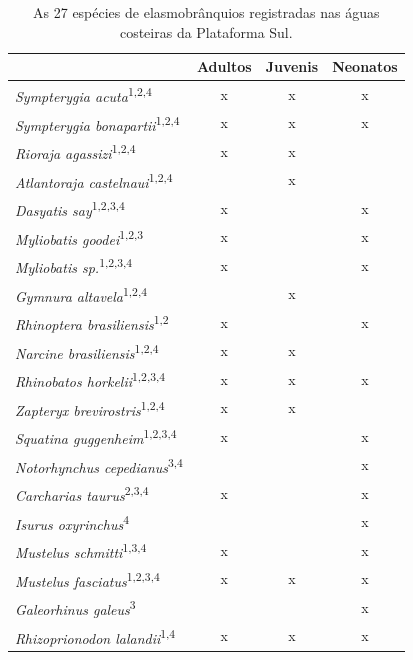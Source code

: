 \documentclass[a4paper,11pt,twoside,showtrims,onecolumn,openright,final]{memoir}
\begin{document}
\begin{table}
\caption[As 27 espécies de elasmobrânquios registradas nas águas costeiras da Plataforma Sul]
	{As 27 espécies de elasmobrânquios registradas nas águas costeiras da Plataforma Sul.}
\label{tab:elasmos-tab2}
\begin{tabular*}{\textwidth}{l@{\extracolsep{\fill}}ccc}
\toprule
								& Adultos	& Juvenis	& Neonatos	\\
\midrule
\emph{Sympterygia acuta}\textsuperscript{1,2,4}			& x		& x		& x	\\
\emph{Sympterygia bonapartii}\textsuperscript{1,2,4}		& x		& x		& x	\\
\emph{Rioraja agassizi}\textsuperscript{1,2,4}			& x		& x		& 	\\
\emph{Atlantoraja castelnaui}\textsuperscript{1,2,4}		& 		& x		& 	\\
\emph{Dasyatis say}\textsuperscript{1,2,3,4}			& x		& 		& x	\\
\emph{Myliobatis goodei}\textsuperscript{1,2,3}			& x		& 		& x	\\
\emph{Myliobatis sp.}\textsuperscript{1,2,3,4}			& x		& 		& x	\\
\emph{Gymnura altavela}\textsuperscript{1,2,4}			& 		& x		& 	\\
\emph{Rhinoptera brasiliensis}\textsuperscript{1,2}		& x		& 		& x	\\
\emph{Narcine brasiliensis}\textsuperscript{1,2,4}		& x		& x		& 	\\
\emph{Rhinobatos horkelii}\textsuperscript{1,2,3,4}		& x		& x		& x	\\
\emph{Zapteryx brevirostris}\textsuperscript{1,2,4}		& x		& x		& 	\\
\emph{Squatina guggenheim}\textsuperscript{1,2,3,4}		& x		& 		& x	\\
\emph{Notorhynchus cepedianus}\textsuperscript{3,4}		& 		& 		& x	\\
\emph{Carcharias taurus}\textsuperscript{2,3,4}			& x		& 		& x	\\
\emph{Isurus oxyrinchus}\textsuperscript{4}			& 		& 		& x	\\
\emph{Mustelus schmitti}\textsuperscript{1,3,4}			& x		& 		& x	\\
\emph{Mustelus fasciatus}\textsuperscript{1,2,3,4}		& x		& x		& x	\\
\emph{Galeorhinus galeus}\textsuperscript{3}			& 		& 		& x	\\
\emph{Rhizoprionodon lalandii}\textsuperscript{1,4}		& x		& x		& x	\\

\end{tabular*}
\end{table}
\end{document}
